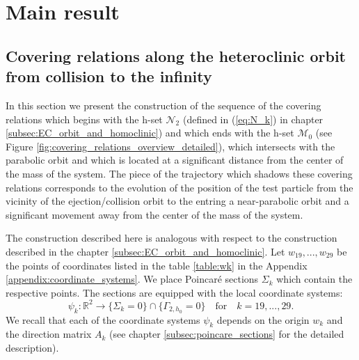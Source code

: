 \documentclass[1p]{article}
\begin{document}
\section{Main result}
\label{sec:main_result}
\subsection{Covering relations along the heteroclinic orbit from collision to the infinity}
\label{subsec:covrel_to_infinity}

In this section we present the construction of the sequence of the covering relations which begins with the h-set $\mathcal{N}_2$ (defined in (\ref{eq:N_k}) in chapter \ref{subsec:EC_orbit_and_homoclinic}) and which ends with the h-set $\mathcal{M}_0$ (see Figure \ref{fig:covering_relations_overview_detailed}), which intersects with the parabolic orbit and which is located at a significant distance from the center of the mass of the system. The piece of the trajectory which shadows these covering relations corresponds to the evolution of the position of the test particle from the vicinity of the ejection/collision orbit to the entring a near-parabolic orbit and a significant movement away from the center of the mass of the system.

The construction described here is analogous with respect to the construction described in the chapter \ref{subsec:EC_orbit_and_homoclinic}. Let $w_{19}, ..., w_{29}$ be the points of coordinates listed in the table \ref{table:wk} in the Appendix \ref{appendix:coordinate_systems}. We place Poincar\'e sections $\Sigma_k$ which contain the respective points. The sections are equipped with the local coordinate systems:
\[
    \psi_k : \mathbb{R}^2 \to \{ \Sigma_k = 0 \} \cap \{ \Gamma_{2,h_0} = 0 \} \quad\mathrm{for}\quad k = 19,...,29.
\]
We recall that each of the coordinate systems $\psi_k$ depends on the origin $w_k$ and the direction matrix $A_k$ (see chapter \ref{subsec:poincare_sections} for the detailed description).
\end{document}
